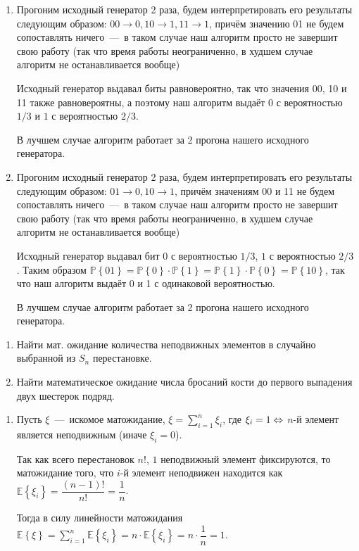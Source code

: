 \documentclass[a4paper,12pt]{article}
\newcommand{\prob}[1]{\mathbb{P}\left\{#1\right\}}
\newcommand{\expected}[1]{\mathbb{E}\left\{#1\right\}}
\begin{document}
\begin{solution}
	\begin{enumerate}
		\item Прогоним исходный генератор 2 раза, будем интерпретировать его результаты следующим образом: $00\longrightarrow 0, 10 \longrightarrow 1, 11 \longrightarrow 1$, причём значению 01 не будем сопоставлять ничего~---~в таком случае наш алгоритм просто не завершит свою работу (так что время работы неограниченно, в худшем случае алгоритм не останавливается вообще)
		
		Исходный генератор выдавал биты равновероятно, так что значения 00, 10 и 11 также равновероятны, а поэтому наш алгоритм выдаёт $0$ с вероятностью $1/3$ и $1$ с вероятностью $2/3$.
		
		В лучшем случае алгоритм работает за 2 прогона нашего исходного генератора.
		
		\item Прогоним исходный генератор 2 раза, будем интерпретировать его результаты следующим образом: $01\longrightarrow 0, 10 \longrightarrow 1$, причём значениям 00 и 11 не будем сопоставлять ничего~---~в таком случае наш алгоритм просто не завершит свою работу (так что время работы неограниченно, в худшем случае алгоритм не останавливается вообще)
		
		Исходный генератор выдавал бит 0 с вероятностью $1/3$, $1$ с вероятностью $2/3$. Таким образом $\prob{01} = \prob{0} \cdot \prob{1} = \prob{1} \cdot \prob{0} = \prob{10}$, так что наш алгоритм выдаёт 0 и 1 с одинаковой вероятностью.
		
		В лучшем случае алгоритм работает за 2 прогона нашего исходного генератора.
	\end{enumerate}
\end{solution}

\begin{tasknum}{7}
	\begin{enumerate}
		\item Найти мат. ожидание количества неподвижных элементов в случайно выбранной из $S_n$ перестановке.   
		
		\item Найти математическое ожидание числа бросаний кости до первого выпадения двух шестерок подряд. 
	\end{enumerate}
\end{tasknum}

\begin{solution}
	\begin{enumerate}
		\item Пусть $\xi$~---~искомое матожидание, $\xi = \displaystyle\sum_{i=1}^n \xi_i$, где $\xi_i = 1 \Leftrightarrow$ $n$-й элемент является неподвижным (иначе $\xi_i = 0$).
		
		Так как всего перестановок $n!$, $1$ неподвижный элемент фиксируются, то матожидание того, что $i$-й элемент неподвижен находится как $\expected{\xi_i} = \dfrac{(n-1)!}{n!} = \dfrac{1}{n}$.
		
		Тогда в силу линейности матожидания $\expected{\xi} = \displaystyle\sum_{i=1}^n \expected{\xi_i} = n \cdot \expected{\xi_i} = n \cdot \dfrac{1}{n} = 1$.
	\end{enumerate}
\end{solution}
\end{document}
